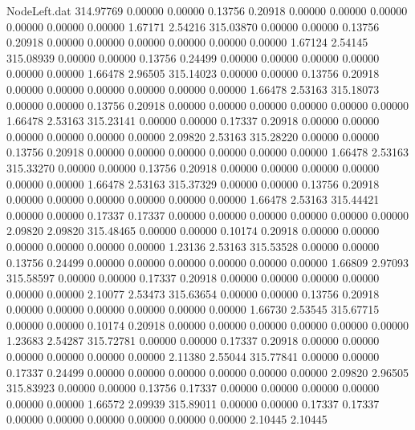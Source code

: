 \begin{filecontents}{NodeLeft.dat}
 314.97769    0.00000    0.00000     0.13756    0.20918    0.00000    0.00000    0.00000    0.00000    0.00000    0.00000    1.67171    2.54216
 315.03870    0.00000    0.00000     0.13756    0.20918    0.00000    0.00000    0.00000    0.00000    0.00000    0.00000    1.67124    2.54145
 315.08939    0.00000    0.00000     0.13756    0.24499    0.00000    0.00000    0.00000    0.00000    0.00000    0.00000    1.66478    2.96505
 315.14023    0.00000    0.00000     0.13756    0.20918    0.00000    0.00000    0.00000    0.00000    0.00000    0.00000    1.66478    2.53163
 315.18073    0.00000    0.00000     0.13756    0.20918    0.00000    0.00000    0.00000    0.00000    0.00000    0.00000    1.66478    2.53163
 315.23141    0.00000    0.00000     0.17337    0.20918    0.00000    0.00000    0.00000    0.00000    0.00000    0.00000    2.09820    2.53163
 315.28220    0.00000    0.00000     0.13756    0.20918    0.00000    0.00000    0.00000    0.00000    0.00000    0.00000    1.66478    2.53163
 315.33270    0.00000    0.00000     0.13756    0.20918    0.00000    0.00000    0.00000    0.00000    0.00000    0.00000    1.66478    2.53163
 315.37329    0.00000    0.00000     0.13756    0.20918    0.00000    0.00000    0.00000    0.00000    0.00000    0.00000    1.66478    2.53163
 315.44421    0.00000    0.00000     0.17337    0.17337    0.00000    0.00000    0.00000    0.00000    0.00000    0.00000    2.09820    2.09820
 315.48465    0.00000    0.00000     0.10174    0.20918    0.00000    0.00000    0.00000    0.00000    0.00000    0.00000    1.23136    2.53163
 315.53528    0.00000    0.00000     0.13756    0.24499    0.00000    0.00000    0.00000    0.00000    0.00000    0.00000    1.66809    2.97093
 315.58597    0.00000    0.00000     0.17337    0.20918    0.00000    0.00000    0.00000    0.00000    0.00000    0.00000    2.10077    2.53473
 315.63654    0.00000    0.00000     0.13756    0.20918    0.00000    0.00000    0.00000    0.00000    0.00000    0.00000    1.66730    2.53545
 315.67715    0.00000    0.00000     0.10174    0.20918    0.00000    0.00000    0.00000    0.00000    0.00000    0.00000    1.23683    2.54287
 315.72781    0.00000    0.00000     0.17337    0.20918    0.00000    0.00000    0.00000    0.00000    0.00000    0.00000    2.11380    2.55044
 315.77841    0.00000    0.00000     0.17337    0.24499    0.00000    0.00000    0.00000    0.00000    0.00000    0.00000    2.09820    2.96505
 315.83923    0.00000    0.00000     0.13756    0.17337    0.00000    0.00000    0.00000    0.00000    0.00000    0.00000    1.66572    2.09939
 315.89011    0.00000    0.00000     0.17337    0.17337    0.00000    0.00000    0.00000    0.00000    0.00000    0.00000    2.10445    2.10445

\end{filecontents}
